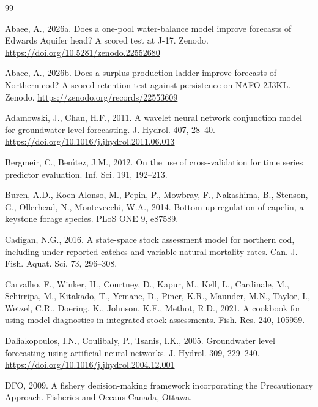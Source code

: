 \documentclass[preprint,11pt,authoryear]{elsarticle}
\theoremstyle{definition}
\theoremstyle{remark}
\begin{document}
\begin{thebibliography}{99}
\providecommand{\natexlab}[1]{#1}

Abaee, A., 2026a. Does a one-pool water-balance model improve forecasts of Edwards Aquifer head? A scored test at J-17. Zenodo. \url{https://doi.org/10.5281/zenodo.22552680}

Abaee, A., 2026b. Does a surplus-production ladder improve forecasts of Northern cod? A scored retention test against persistence on NAFO 2J3KL. Zenodo. \url{https://zenodo.org/records/22553609}

Adamowski, J., Chan, H.F., 2011. A wavelet neural network conjunction model for groundwater level forecasting. J. Hydrol. 407, 28--40. \url{https://doi.org/10.1016/j.jhydrol.2011.06.013}

Bergmeir, C., Ben{\'\i}tez, J.M., 2012. On the use of cross-validation for time series predictor evaluation. Inf. Sci. 191, 192--213.

Buren, A.D., Koen-Alonso, M., Pepin, P., Mowbray, F., Nakashima, B., Stenson, G., Ollerhead, N., Montevecchi, W.A., 2014. Bottom-up regulation of capelin, a keystone forage species. PLoS ONE 9, e87589.

Cadigan, N.G., 2016. A state-space stock assessment model for northern cod, including under-reported catches and variable natural mortality rates. Can. J. Fish. Aquat. Sci. 73, 296--308.

Carvalho, F., Winker, H., Courtney, D., Kapur, M., Kell, L., Cardinale, M., Schirripa, M., Kitakado, T., Yemane, D., Piner, K.R., Maunder, M.N., Taylor, I., Wetzel, C.R., Doering, K., Johnson, K.F., Methot, R.D., 2021. A cookbook for using model diagnostics in integrated stock assessments. Fish. Res. 240, 105959.

Daliakopoulos, I.N., Coulibaly, P., Tsanis, I.K., 2005. Groundwater level forecasting using artificial neural networks. J. Hydrol. 309, 229--240. \url{https://doi.org/10.1016/j.jhydrol.2004.12.001}

DFO, 2009. A fishery decision-making framework incorporating the Precautionary Approach. Fisheries and Oceans Canada, Ottawa.


\end{thebibliography}
\end{document}
